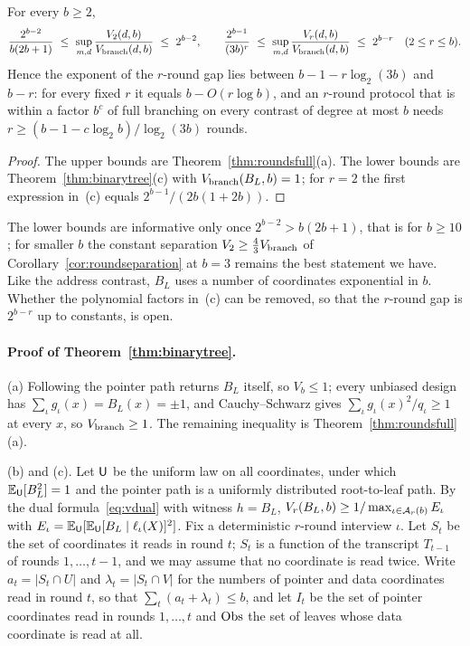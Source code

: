 \begin{corollary}\label{cor:fewrounds}
For every $b\ge2$,
\[
 \frac{2^{b-2}}{b(2b+1)}\ \le\ \sup_{m,d}\frac{V_2(d,b)}{V_{\rm branch}(d,b)}\ \le\ 2^{b-2},
 \qquad
 \frac{2^{b-1}}{(3b)^{r}}\ \le\ \sup_{m,d}\frac{V_r(d,b)}{V_{\rm branch}(d,b)}\ \le\ 2^{b-r}
 \quad(2\le r\le b).
\]
Hence the exponent of the $r$-round gap lies between $b-1-r\log_2(3b)$ and
$b-r$: for every fixed $r$ it equals $b-O(r\log b)$, and an $r$-round protocol
that is within a factor $b^{c}$ of full branching on every contrast of degree
at most $b$ needs $r\ge(b-1-c\log_2b)/\log_2(3b)$ rounds.
\end{corollary}
\begin{proof}
The upper bounds are Theorem~\ref{thm:roundsfull}(a). The lower bounds are
Theorem~\ref{thm:binarytree}(c) with $V_{\rm branch}(B_L,b)=1$; for $r=2$
the first expression in~(c) equals $2^{b-1}/(2b(1+2b))$.
\end{proof}

The lower bounds are informative only once $2^{b-2}>b(2b+1)$, that is for
$b\ge10$; for smaller $b$ the constant separation $V_2\ge\tfrac43V_{\rm
branch}$ of Corollary~\ref{cor:roundseparation} at $b=3$ remains the best
statement we have. Like the address contrast, $B_L$ uses a number of
coordinates exponential in $b$. Whether the polynomial factors in~(c) can be
removed, so that the $r$-round gap is $2^{b-r}$ up to constants, is open.

\paragraph{Proof of Theorem~\ref{thm:binarytree}.}
(a) Following the pointer path returns $B_L$ itself, so $V_b\le1$; every
unbiased design has $\sum_\iota g_\iota(x)=B_L(x)=\pm1$, and Cauchy--Schwarz
gives $\sum_\iota g_\iota(x)^2/q_\iota\ge1$ at every $x$, so $V_{\rm branch}\ge1$.
The remaining inequality is Theorem~\ref{thm:roundsfull}(a).

(b) and (c). Let $\mathsf U$ be the uniform law on all coordinates, under which
$\mathbb{E}_\mathsf U[B_L^2]=1$ and the pointer path is a uniformly distributed root-to-leaf
path. By the dual formula~\eqref{eq:vdual} with witness $h=B_L$,
$V_r(B_L,b)\ge1/\max_{\iota\in\mathcal A_r(b)}E_\iota$ with
$E_\iota=\mathbb{E}_\mathsf U[\mathbb{E}_\mathsf U[B_L\mid\ell_\iota(X)]^2]$. Fix a deterministic $r$-round
interview $\iota$. Let $S_t$ be the set of coordinates it reads in round $t$;
$S_t$ is a function of the transcript $T_{t-1}$ of rounds $1,\ldots,t-1$, and
we may assume that no coordinate is read twice. Write $a_t=|S_t\cap U|$ and
$\lambda_t=|S_t\cap V|$ for the numbers of pointer and data coordinates read
in round $t$, so that $\sum_t(a_t+\lambda_t)\le b$, and let $I_t$ be the set of
pointer coordinates read in rounds $1,\ldots,t$ and ${\rm Obs}$ the set of
leaves whose data coordinate is read at all.

